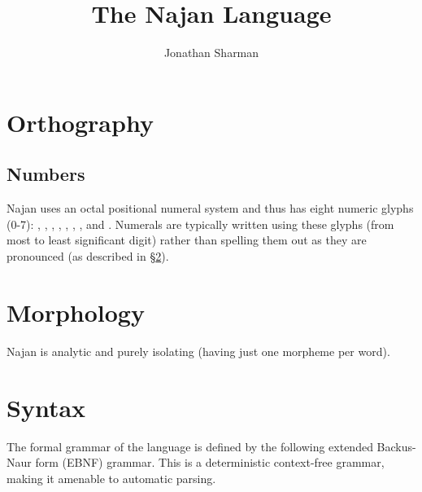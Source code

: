 \NewDocumentCommand{\down}{}{$\Downarrow$ \\}

\title{ \\ The Najan Language}
\author{Jonathan Sharman}



\listoftodos

\maketitle

\tableofcontents

\twocolumn

\section{Orthography} \label{sec:orthography}

\subsection{Numbers}


Najan uses an octal positional numeral system and thus has eight numeric glyphs
(0-7): , , , , , , , and
. Numerals are typically written using these glyphs (from most to least
significant digit) rather than spelling them out as they are pronounced (as
described in \S\ref{sec:morphology}).

\section{Morphology} \label{sec:morphology}

Najan is analytic and purely isolating (having just one morpheme per word).

\section{Syntax} \label{sec:syntax}

The formal grammar of the language is defined by the following extended
Backus-Naur form (EBNF) grammar. This is a deterministic context-free grammar,
making it amenable to automatic parsing.

